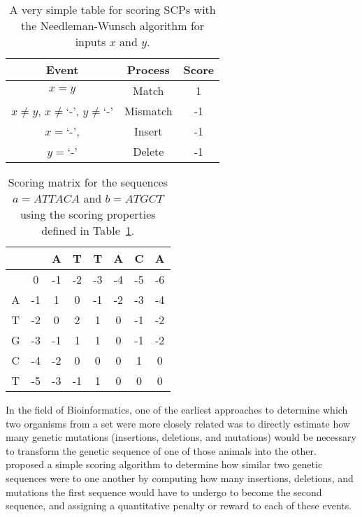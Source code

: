 \begin{table}
\begin{center}

\begin{tabular}{ c c c}
 \textbf{Event}&\textbf{Process} & \textbf{Score} \\ 
 \hline
 $x=y$ & Match & 1 \\
 $x\neq y$, $x \neq $`-', $y \neq $`-' & Mismatch & -1 \\
 $x=$`-',& Insert & -1 \\
 $y=$`-'& Delete & -1
\end{tabular}
\caption{A very simple table for scoring SCPs with the Needleman-Wunsch algorithm for inputs $x$ and $y$.}
\label{tbl:simpleneed}

\end{center}
\end{table}

\begin{table}
\begin{center}
\begin{tabular}{c | c c c c c c c }
 & & A & T & T & A & C & A\\
 \hline
 & 0 & -1 & -2 & -3 & -4 & -5 & -6\\
A & -1 & 1 & 0 & -1 & -2 & -3 & -4\\
T & -2 & 0 & 2 & 1 & 0 & -1 & -2\\
G & -3 & -1 & 1 & 1 & 0 & -1 & -2\\
C & -4 & -2 & 0 & 0 & 0 & 1 & 0\\
T & -5 & -3 & -1 & 1 & 0 & 0 & 0
\end{tabular}
\caption{Scoring matrix for the sequences $a=ATTACA$ and $b=ATGCT$ using the scoring properties defined in Table~\ref{tbl:simpleneed}.}
\label{tbl:NW_nucleotides}
\end{center}
\end{table}


In the field of Bioinformatics, one of the earliest approaches to determine which two organisms from a set were more closely related was to directly estimate how many genetic mutations (insertions, deletions, and mutations) would be necessary to transform the genetic sequence of one of those animals into the other. \cite{needleman1970general} proposed a simple scoring algorithm to determine how similar two genetic sequences were to one another by computing how many insertions, deletions, and mutations the first sequence would have to undergo to become the second sequence, and assigning a quantitative penalty or reward to each of these events. 

